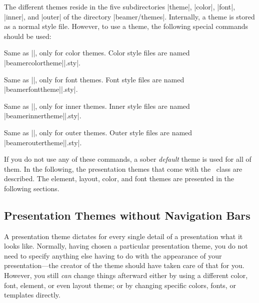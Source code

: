 The different themes reside in the five subdirectories |theme|, |color|, |font|, |inner|, and |outer| of the directory |beamer/themes|. Internally, a theme is stored as a normal style file. However, to use a theme, the following special commands should be used:



\begin{command}{\usecolortheme{}}
  Same as |\usetheme|, only for color themes. Color style files are named |beamercolortheme||.sty|.
\end{command}

\begin{command}{\usefonttheme{}}
  Same as |\usetheme|, only for font themes. Font style files are named |beamerfonttheme||.sty|.
\end{command}

\begin{command}{\useinnertheme{}}
  Same as |\usetheme|, only for inner themes. Inner style files are named |beamerinnertheme||.sty|.
\end{command}

\begin{command}{\useoutertheme{}}
  Same as |\usetheme|, only for outer themes. Outer style files are named |beameroutertheme||.sty|.
\end{command}

If you do not use any of these commands, a sober \emph{default} theme is used for all of them. In the following, the presentation themes that come with the \beamer\ class are described. The element, layout, color, and font themes  are presented in the following sections.


\subsection{Presentation Themes without Navigation Bars}

A presentation theme dictates for every single detail of a presentation what it looks like. Normally, having chosen a particular presentation theme, you do not need to specify anything else having to do with the appearance of your presentation---the creator of the theme should have taken care of that for you. However, you still \emph{can} change things afterward either by using a different color, font, element, or even layout theme; or by changing specific colors, fonts, or templates directly.

